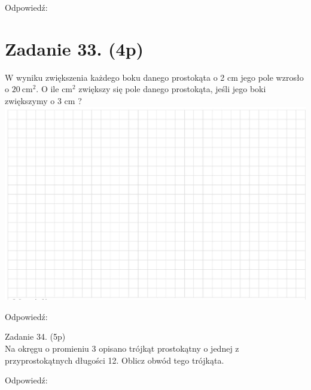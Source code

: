 \documentclass[10pt]{article}
\begin{document}
Odpowiedź:

\section*{Zadanie 33. (4p)}
W wyniku zwiększenia każdego boku danego prostokąta o 2 cm jego pole wzrosło o \(20 \mathrm{~cm}^{2}\). O ile \(\mathrm{cm}^{2}\) zwiększy się pole danego prostokąta, jeśli jego boki zwiększymy o 3 cm ?\\
\includegraphics[max width=\textwidth, center]{2024_11_21_cce9c7ad32a1dbcd58dag-11(1)}

Odpowiedź:

Zadanie 34. (5p)\\
Na okręgu o promieniu 3 opisano trójkąt prostokątny o jednej z przyprostokątnych długości 12. Oblicz obwód tego trójkąta.

Odpowiedź:
\end{document}
